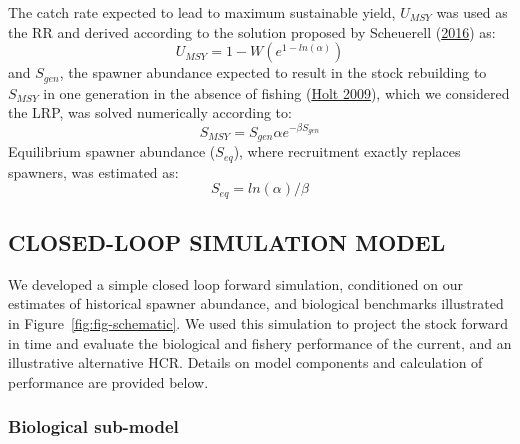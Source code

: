 \documentclass[french,11pt]{book}
\begin{document}
The catch rate expected to lead to maximum sustainable yield, \(U_{MSY}\) was used as the RR and derived according to the solution proposed by Scheuerell (\protect\hyperlink{ref-scheuerellExplicitSolutionCalculating2016}{2016}) as:
\begin{equation}
U_{MSY} = 1 - W(e^{1-ln(\alpha)})
\label{eq:get-Umsy}
\end{equation}
and \(S_{gen}\), the spawner abundance expected to result in the stock rebuilding to \(S_{MSY}\) in one generation in the absence of fishing (\protect\hyperlink{ref-holtEvaluationBenchmarksConservation2009}{Holt 2009}), which we considered the LRP, was solved numerically according to:
\begin{equation}
S_{MSY} = S_{gen}\alpha e^{-\beta S_{gen}}
\label{eq:get-Sgen}
\end{equation}
Equilibrium spawner abundance (\(S_{eq}\)), where recruitment exactly replaces spawners, was estimated as:
\begin{equation}
S_{eq} = ln(\alpha)/\beta
\label{eq:get-Seq}
\end{equation}
\hypertarget{closed-loop-simulation-model}{%
\subsection{CLOSED-LOOP SIMULATION MODEL}\label{closed-loop-simulation-model}}

We developed a simple closed loop forward simulation, conditioned on our estimates of historical spawner abundance, and biological benchmarks illustrated in Figure~\ref{fig:fig-schematic}. We used this simulation to project the stock forward in time and evaluate the biological and fishery performance of the current, and an illustrative alternative HCR. Details on model components and calculation of performance are provided below.

\hypertarget{biological-sub-model}{%
\subsubsection{Biological sub-model}\label{biological-sub-model}}
\end{document}
